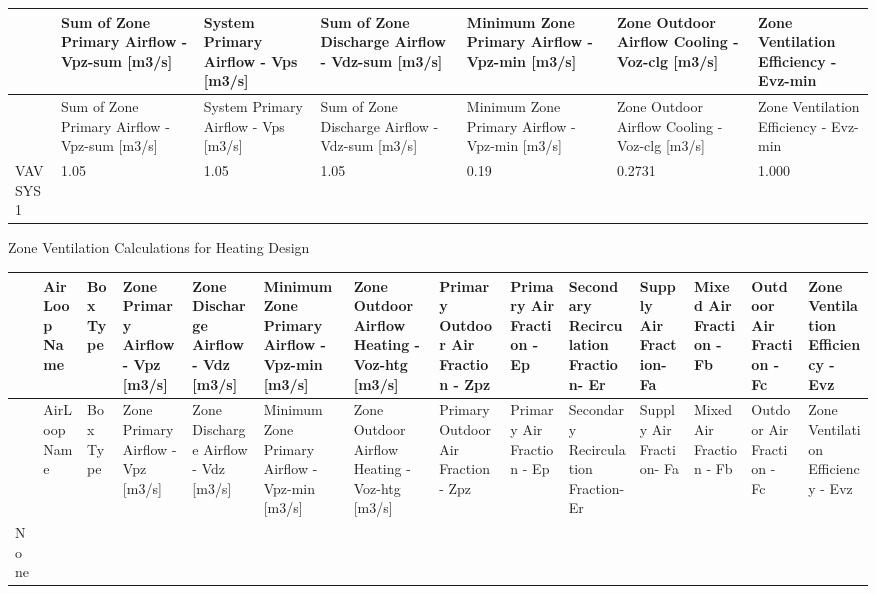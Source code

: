 {\scriptsize
\begin{longtable}[c]{>{\raggedright}p{0.85in}>{\raggedright}p{0.85in}>{\raggedright}p{0.85in}>{\raggedright}p{0.85in}>{\raggedright}p{0.85in}>{\raggedright}p{0.85in}>{\raggedright}p{0.85in}}
\toprule 
 & Sum of Zone Primary Airflow - Vpz-sum [m3/s] & System Primary Airflow - Vps [m3/s] & Sum of Zone Discharge Airflow - Vdz-sum [m3/s] & Minimum Zone Primary Airflow - Vpz-min [m3/s] & Zone Outdoor Airflow Cooling - Voz-clg [m3/s] & Zone Ventilation Efficiency - Evz-min \tabularnewline
\midrule
\endfirsthead

\toprule 
 & Sum of Zone Primary Airflow - Vpz-sum [m3/s] & System Primary Airflow - Vps [m3/s] & Sum of Zone Discharge Airflow - Vdz-sum [m3/s] & Minimum Zone Primary Airflow - Vpz-min [m3/s] & Zone Outdoor Airflow Cooling - Voz-clg [m3/s] & Zone Ventilation Efficiency - Evz-min \tabularnewline
\midrule
\endhead

VAV SYS 1 & 1.05 & 1.05 & 1.05 & 0.19 & 0.2731 & 1.000 \tabularnewline
\bottomrule
\end{longtable}}

Zone Ventilation Calculations for Heating Design

{\scriptsize
\begin{longtable}[c]{>{\raggedright}p{0.42in}>{\raggedright}p{0.42in}>{\raggedright}p{0.42in}>{\raggedright}p{0.42in}>{\raggedright}p{0.42in}>{\raggedright}p{0.42in}>{\raggedright}p{0.42in}>{\raggedright}p{0.42in}>{\raggedright}p{0.42in}>{\raggedright}p{0.42in}>{\raggedright}p{0.42in}>{\raggedright}p{0.42in}>{\raggedright}p{0.42in}>{\raggedright}p{0.42in}}
\toprule 
 & AirLoop Name & Box Type & Zone Primary Airflow - Vpz [m3/s] & Zone Discharge Airflow - Vdz [m3/s] & Minimum Zone Primary Airflow - Vpz-min [m3/s] & Zone Outdoor Airflow Heating - Voz-htg [m3/s] & Primary Outdoor Air Fraction - Zpz & Primary Air Fraction - Ep & Secondary Recirculation Fraction- Er & Supply Air Fraction- Fa & Mixed Air Fraction - Fb & Outdoor Air Fraction - Fc & Zone Ventilation Efficiency - Evz \tabularnewline
\midrule
\endfirsthead

\toprule 
 & AirLoop Name & Box Type & Zone Primary Airflow - Vpz [m3/s] & Zone Discharge Airflow - Vdz [m3/s] & Minimum Zone Primary Airflow - Vpz-min [m3/s] & Zone Outdoor Airflow Heating - Voz-htg [m3/s] & Primary Outdoor Air Fraction - Zpz & Primary Air Fraction - Ep & Secondary Recirculation Fraction- Er & Supply Air Fraction- Fa & Mixed Air Fraction - Fb & Outdoor Air Fraction - Fc & Zone Ventilation Efficiency - Evz \tabularnewline
\midrule
\endhead

None & ~ & ~ & ~ & ~ & ~ & ~ & ~ & ~ & ~ & ~ & ~ & ~ & ~ \tabularnewline
\bottomrule
\end{longtable}}

